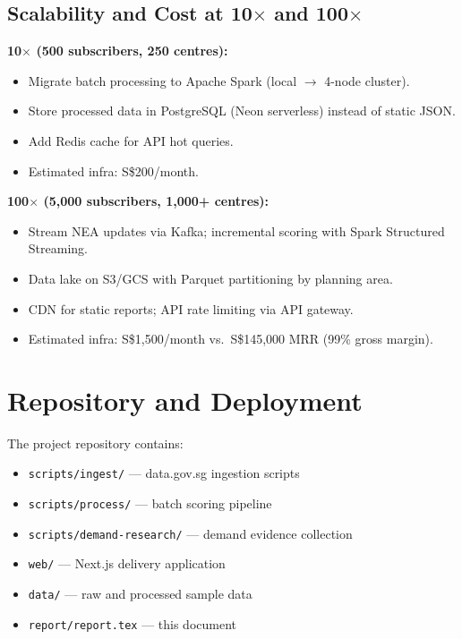 \documentclass[11pt,a4paper]{article}
\begin{document}
\subsection{Scalability and Cost at 10$\times$ and 100$\times$}

\textbf{10$\times$ (500 subscribers, 250 centres):}
\begin{itemize}
  \item Migrate batch processing to Apache Spark (local $\rightarrow$ 4-node cluster).
  \item Store processed data in PostgreSQL (Neon serverless) instead of static JSON.
  \item Add Redis cache for API hot queries.
  \item Estimated infra: S\$200/month.
\end{itemize}

\textbf{100$\times$ (5,000 subscribers, 1,000+ centres):}
\begin{itemize}
  \item Stream NEA updates via Kafka; incremental scoring with Spark Structured Streaming.
  \item Data lake on S3/GCS with Parquet partitioning by planning area.
  \item CDN for static reports; API rate limiting via API gateway.
  \item Estimated infra: S\$1,500/month vs.\ S\$145,000 MRR (99\% gross margin).
\end{itemize}

\section{Repository and Deployment}

The project repository contains:
\begin{itemize}
  \item \texttt{scripts/ingest/} --- data.gov.sg ingestion scripts
  \item \texttt{scripts/process/} --- batch scoring pipeline
  \item \texttt{scripts/demand-research/} --- demand evidence collection
  \item \texttt{web/} --- Next.js delivery application
  \item \texttt{data/} --- raw and processed sample data
  \item \texttt{report/report.tex} --- this document
\end{itemize}
\end{document}
